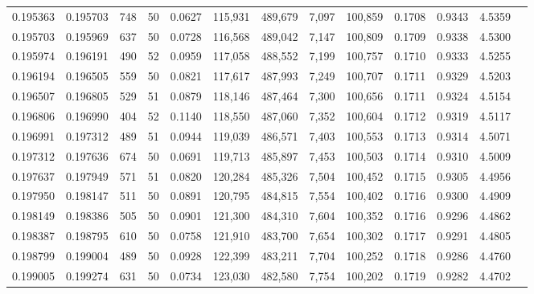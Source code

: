 \begin{tabular}{rrrrrrrrrrrrr}
0.195363 & 0.195703 &   748 &  50 &                                     0.0627 & 115,931 & 489,679 &   7,097 & 100,859 & 0.1708 & 0.9343 & 4.5359 \\
0.195703 & 0.195969 &   637 &  50 &                                     0.0728 & 116,568 & 489,042 &   7,147 & 100,809 & 0.1709 & 0.9338 & 4.5300 \\
0.195974 & 0.196191 &   490 &  52 &                                     0.0959 & 117,058 & 488,552 &   7,199 & 100,757 & 0.1710 & 0.9333 & 4.5255 \\
0.196194 & 0.196505 &   559 &  50 &                                     0.0821 & 117,617 & 487,993 &   7,249 & 100,707 & 0.1711 & 0.9329 & 4.5203 \\
0.196507 & 0.196805 &   529 &  51 &                                     0.0879 & 118,146 & 487,464 &   7,300 & 100,656 & 0.1711 & 0.9324 & 4.5154 \\
0.196806 & 0.196990 &   404 &  52 &                                     0.1140 & 118,550 & 487,060 &   7,352 & 100,604 & 0.1712 & 0.9319 & 4.5117 \\
0.196991 & 0.197312 &   489 &  51 &                                     0.0944 & 119,039 & 486,571 &   7,403 & 100,553 & 0.1713 & 0.9314 & 4.5071 \\
0.197312 & 0.197636 &   674 &  50 &                                     0.0691 & 119,713 & 485,897 &   7,453 & 100,503 & 0.1714 & 0.9310 & 4.5009 \\
0.197637 & 0.197949 &   571 &  51 &                                     0.0820 & 120,284 & 485,326 &   7,504 & 100,452 & 0.1715 & 0.9305 & 4.4956 \\
0.197950 & 0.198147 &   511 &  50 &                                     0.0891 & 120,795 & 484,815 &   7,554 & 100,402 & 0.1716 & 0.9300 & 4.4909 \\
0.198149 & 0.198386 &   505 &  50 &                                     0.0901 & 121,300 & 484,310 &   7,604 & 100,352 & 0.1716 & 0.9296 & 4.4862 \\
0.198387 & 0.198795 &   610 &  50 &                                     0.0758 & 121,910 & 483,700 &   7,654 & 100,302 & 0.1717 & 0.9291 & 4.4805 \\
0.198799 & 0.199004 &   489 &  50 &                                     0.0928 & 122,399 & 483,211 &   7,704 & 100,252 & 0.1718 & 0.9286 & 4.4760 \\
0.199005 & 0.199274 &   631 &  50 &                                     0.0734 & 123,030 & 482,580 &   7,754 & 100,202 & 0.1719 & 0.9282 & 4.4702 \\

\end{tabular}

